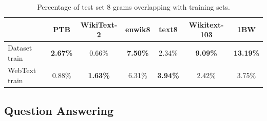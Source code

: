 \documentclass{article}
\begin{document}
\begin{table}[t]
\vskip 0.15in
\begin{center}
\begin{small}
\begin{tabular}{lcccccc}
\toprule
 & PTB & WikiText-2 & enwik8 & text8 & Wikitext-103 & 1BW  \\ %
\midrule
Dataset train & \bf{2.67}\% & 0.66\% & \bf{7.50}\% & 2.34\% & \bf{9.09}\% & \bf{13.19}\% \\ %
\midrule
WebText train & 0.88\% & \bf{1.63}\% & 6.31\% & \bf{3.94}\% & 2.42\% & 3.75\% \\ %
\bottomrule
\end{tabular}
\end{small}
\caption{Percentage of test set 8 grams overlapping with training sets.}
\label{overlaptable}
\end{center}
\vskip -0.1in
\end{table}

\subsection{Question Answering}
\end{document}
